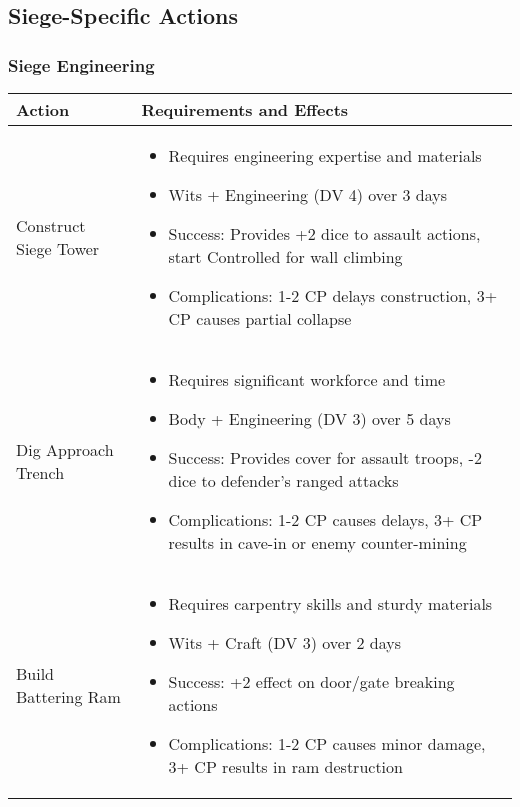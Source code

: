\documentclass[11pt,letterpaper]{article}
\begin{document}
\subsection{Siege-Specific Actions}

\subsubsection{Siege Engineering}

\begin{longtable}{|>{\raggedright\arraybackslash}p{4cm}|>{\raggedright\arraybackslash}p{8cm}|}
\hline
\textbf{Action} & \textbf{Requirements and Effects} \\
\hline
Construct Siege Tower & 
\begin{itemize}
    \item Requires engineering expertise and materials
    \item Wits + Engineering (DV 4) over 3 days
    \item Success: Provides +2 dice to assault actions, start Controlled for wall climbing
    \item Complications: 1-2 CP delays construction, 3+ CP causes partial collapse
\end{itemize} \\
\hline
Dig Approach Trench & 
\begin{itemize}
    \item Requires significant workforce and time
    \item Body + Engineering (DV 3) over 5 days
    \item Success: Provides cover for assault troops, -2 dice to defender's ranged attacks
    \item Complications: 1-2 CP causes delays, 3+ CP results in cave-in or enemy counter-mining
\end{itemize} \\
\hline
Build Battering Ram & 
\begin{itemize}
    \item Requires carpentry skills and sturdy materials
    \item Wits + Craft (DV 3) over 2 days
    \item Success: +2 effect on door/gate breaking actions
    \item Complications: 1-2 CP causes minor damage, 3+ CP results in ram destruction
\end{itemize} \\
\hline
\end{longtable}
\end{document}
